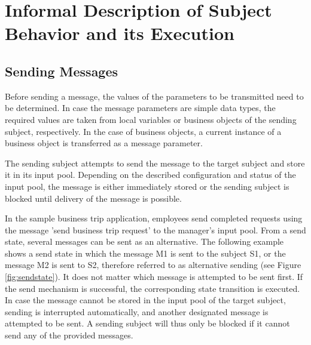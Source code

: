 \section{Informal Description of Subject Behavior and its Execution}





\subsection{Sending Messages}

Before sending a message, the values of the parameters to be transmitted need to be determined. In case the message parameters are simple data types, the required values are taken from local variables or business objects of the sending subject, respectively. In the case of business objects, a current instance of a business object is transferred as a message parameter.

The sending subject attempts to send the message to the target subject and store it in its input pool. Depending on the described configuration and status of the input pool, the message is either immediately stored or the sending subject is blocked until delivery of the message is possible.

In the sample business trip application, employees send completed requests using the message 'send business trip request' to the manager's input pool. From a send state, several messages can be sent as an alternative. The following example shows a send state in which the message M1 is sent to the subject S1, or the message M2 is sent to S2, therefore referred to as alternative sending (see Figure \ref{fig:sendstate}). It does not matter which message is attempted to be sent first. If the send mechanism is successful, the corresponding state transition is executed. In case the message cannot be stored in the input pool of the target subject, sending is interrupted automatically, and another designated message is attempted to be sent. A sending subject will thus only be blocked if it cannot send any of the provided messages.

